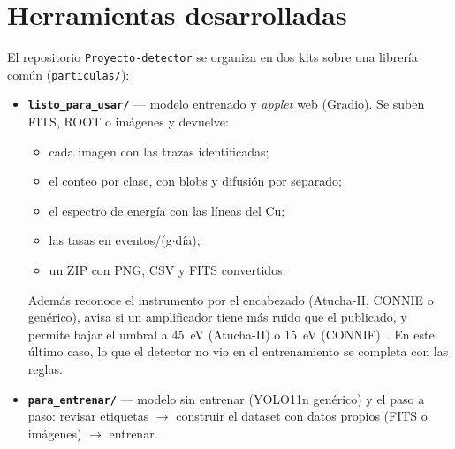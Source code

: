 \documentclass[10pt,a4paper]{article}
\begin{document}
\section{Herramientas desarrolladas}
El repositorio \texttt{Proyecto-detector} se organiza en dos kits sobre una librería común (\texttt{particulas/}):
\begin{itemize}
\item \textbf{\texttt{listo\_para\_usar/}} --- modelo entrenado y \emph{applet} web (Gradio). Se suben FITS, ROOT o
imágenes y devuelve:
  \begin{itemize}
  \item cada imagen con las trazas identificadas;
  \item el conteo por clase, con blobs y difusión por separado;
  \item el espectro de energía con las líneas del Cu;
  \item las tasas en eventos/(g$\cdot$día);
  \item un ZIP con PNG, CSV y FITS convertidos.
  \end{itemize}
  Además reconoce el instrumento por el encabezado (Atucha-II, CONNIE o genérico), avisa si un amplificador
  tiene más ruido que el publicado, y permite bajar el umbral a 45~eV (Atucha-II) o 15~eV (CONNIE)~\cite{connie2025}.
  En este último caso, lo que el detector no vio en el entrenamiento se completa con las reglas.
\item \textbf{\texttt{para\_entrenar/}} --- modelo sin entrenar (YOLO11n genérico) y el paso a paso:
  revisar etiquetas $\rightarrow$ construir el dataset con datos propios (FITS o imágenes) $\rightarrow$ entrenar.
\end{itemize}

\end{document}
